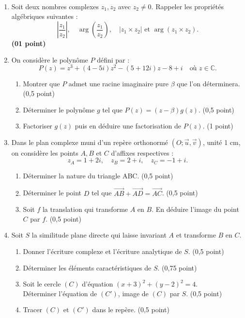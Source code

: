\documentclass[11pt]{article}
\begin{document}
\begin{enumerate}[label=\Alph*.]
\item Soit deux nombres complexes \( z_1, z_2 \) avec \( z_2 \ne 0 \). Rappeler les propriétés algébriques suivantes : 
\[
\left| \frac{z_1}{z_2} \right|, \quad \arg\left(\frac{z_1}{z_2}\right), \quad |z_1 \times z_2| \text{ et } \arg(z_1 \times z_2).
\] 
\hfill \textbf{(01 point)}

\item On considère le polynôme \( P \) défini par : \\
\[
P(z) = z^3 + (4 - 5i)z^2 - (5 + 12i)z - 8 + i \quad \text{où } z \in \mathbb{C}.
\]
\begin{enumerate}
    \item Montrer que \( P \) admet une racine imaginaire pure \( \beta \) que l’on déterminera. \hfill (0,5 point)
    \item Déterminer le polynôme \( g \) tel que \( P(z) = (z - \beta)g(z) \). \hfill (0,5 point)
    \item Factoriser \( g(z) \) puis en déduire une factorisation de \( P(z) \). \hfill (1 point)
\end{enumerate}

\item Dans le plan complexe muni d’un repère orthonormé \((O; \vec{u}, \vec{v})\), unité 1 cm, on considère les points \( A, B \) et \( C \) d’affixes respectives :
\[
z_A = 1 + 2i,\quad z_B = 2 + i,\quad z_C = -1 + i.
\]
\begin{enumerate}
    \item Déterminer la nature du triangle ABC. \hfill (0,5 point)
    \item Déterminer le point \( D \) tel que \( \vec{AB} + \vec{AD} = \vec{AC} \). \hfill (0,5 point)
    \item Soit \( f \) la translation qui transforme \( A \) en \( B \). En déduire l’image du point \( C \) par \( f \). \hfill (0,5 point)
\end{enumerate}

\item Soit \( S \) la similitude plane directe qui laisse invariant \( A \) et transforme \( B \) en \( C \).
\begin{enumerate}
    \item Donner l’écriture complexe et l’écriture analytique de \( S \). \hfill (0,5 point)
    \item Déterminer les éléments caractéristiques de \( S \). \hfill (0,75 point)
    \item Soit le cercle \( (C) \) d’équation \( (x + 3)^2 + (y - 2)^2 = 4 \). \\
    Déterminer l’équation de \( (C') \), image de \( (C) \) par \( S \). \hfill (0,5 point)
    \item Tracer \( (C) \) et \( (C') \) dans le repère. \hfill (0,5 point)
\end{enumerate}
\end{enumerate}
\end{document}

